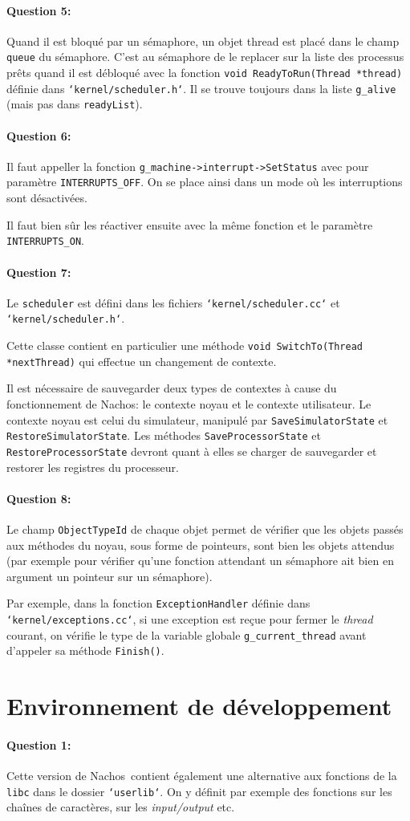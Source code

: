 \documentclass[11pt]{article}
\def\question#1{\paragraph{Question #1:}}
\def\pathfile#1{\texttt{`#1`}}
\def\var#1{\texttt{#1}}
\def\func#1{\texttt{#1}}
\def\obj#1{\texttt{#1}}
\def\nachos{Nachos}
\begin{document}
\question{5} Quand il est bloqué par un sémaphore, un objet thread est placé dans le champ \var{queue} du sémaphore. C'est au sémaphore de le replacer sur la liste des processus prêts quand il est débloqué avec la fonction \func{void ReadyToRun(Thread *thread)} définie dans \pathfile{kernel/scheduler.h}. Il se trouve toujours dans la liste \var{g\_alive} (mais pas dans \var{readyList}).

\question{6} Il faut appeller la fonction \func{g\_machine->interrupt->SetStatus} avec pour paramètre \var{INTERRUPTS\_OFF}. On se place ainsi dans un mode où les interruptions sont désactivées.

Il faut bien sûr les réactiver ensuite avec la même fonction et le paramètre \var{INTERRUPTS\_ON}.

\question{7}  Le \obj{scheduler} est défini dans les fichiers \pathfile{kernel/scheduler.cc} et \pathfile{kernel/scheduler.h}.

Cette classe contient en particulier une méthode \func{void SwitchTo(Thread *nextThread)} qui effectue un changement de contexte.

Il est nécessaire de sauvegarder deux types de contextes à cause du fonctionnement de \nachos: le contexte noyau et le contexte utilisateur.
Le contexte noyau est celui du simulateur, manipulé par \func{SaveSimulatorState} et \func{RestoreSimulatorState}.
Les méthodes \func{SaveProcessorState} et \func{RestoreProcessorState} devront quant à elles se charger de sauvegarder et restorer les registres du processeur.

\question{8}  Le champ \var{ObjectTypeId} de chaque objet permet de vérifier que les objets passés aux méthodes du noyau, sous forme de pointeurs, sont bien les objets attendus (par exemple pour vérifier qu'une fonction attendant un sémaphore ait bien en argument un pointeur sur un sémaphore).

Par exemple, dans la fonction \func{ExceptionHandler} définie dans \pathfile{kernel/exceptions.cc}, si une exception est reçue pour fermer le \textit{thread} courant, on vérifie le type de la variable globale \var{g\_current\_thread} avant d'appeler sa méthode \func{Finish()}.

\section*{Environnement de développement}
\question{1}
Cette version de \nachos\ contient également une alternative aux fonctions de la \texttt{libc} dans le dossier \pathfile{userlib}. On y définit par exemple des fonctions sur les chaînes de caractères, sur les \textit{input/output} etc.
\end{document}
